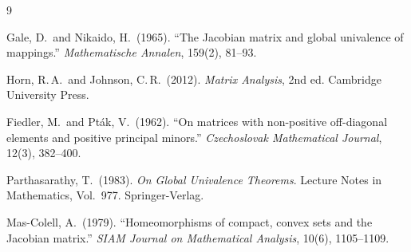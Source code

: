 \documentclass[11pt,a4paper]{article}
\theoremstyle{definition}
\begin{document}

\begin{thebibliography}{9}

Gale, D.\ and Nikaido, H.\ (1965).
``The Jacobian matrix and global univalence of mappings.''
\textit{Mathematische Annalen}, 159(2), 81--93.

Horn, R.\,A.\ and Johnson, C.\,R.\ (2012).
\textit{Matrix Analysis}, 2nd ed.
Cambridge University Press.

Fiedler, M.\ and Pt\'ak, V.\ (1962).
``On matrices with non-positive off-diagonal elements and positive
principal minors.''
\textit{Czechoslovak Mathematical Journal}, 12(3), 382--400.

Parthasarathy, T.\ (1983).
\textit{On Global Univalence Theorems}.
Lecture Notes in Mathematics, Vol.\ 977.
Springer-Verlag.

Mas-Colell, A.\ (1979).
``Homeomorphisms of compact, convex sets and the Jacobian matrix.''
\textit{SIAM Journal on Mathematical Analysis}, 10(6), 1105--1109.

\end{thebibliography}
\end{document}
